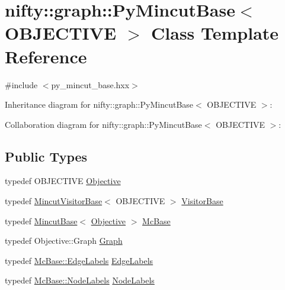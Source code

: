 \hypertarget{classnifty_1_1graph_1_1PyMincutBase}{}\section{nifty\+:\+:graph\+:\+:Py\+Mincut\+Base$<$ O\+B\+J\+E\+C\+T\+I\+V\+E $>$ Class Template Reference}
\label{classnifty_1_1graph_1_1PyMincutBase}


{\ttfamily \#include $<$py\+\_\+mincut\+\_\+base.\+hxx$>$}



Inheritance diagram for nifty\+:\+:graph\+:\+:Py\+Mincut\+Base$<$ O\+B\+J\+E\+C\+T\+I\+V\+E $>$\+:


Collaboration diagram for nifty\+:\+:graph\+:\+:Py\+Mincut\+Base$<$ O\+B\+J\+E\+C\+T\+I\+V\+E $>$\+:
\subsection*{Public Types}
\begin{DoxyCompactItemize}
\item 
typedef O\+B\+J\+E\+C\+T\+I\+V\+E \hyperlink{classnifty_1_1graph_1_1PyMincutBase_a0d42d028691f6bc4cc12dc98d72a551a}{Objective}
\item 
typedef \hyperlink{namespacenifty_1_1graph_abcf758110c216f393d7f20219d3fcf1b}{Mincut\+Visitor\+Base}$<$ O\+B\+J\+E\+C\+T\+I\+V\+E $>$ \hyperlink{classnifty_1_1graph_1_1PyMincutBase_a29aa86dab1d9d51b0c53992df95f94b7}{Visitor\+Base}
\item 
typedef \hyperlink{classnifty_1_1graph_1_1MincutBase}{Mincut\+Base}$<$ \hyperlink{classnifty_1_1graph_1_1MincutBase_afac19d146202da5a1d3a4aa4b89ea1fc}{Objective} $>$ \hyperlink{classnifty_1_1graph_1_1PyMincutBase_a0bf9e1bc1cb78b5950ca9d470eb12428}{Mc\+Base}
\item 
typedef Objective\+::\+Graph \hyperlink{classnifty_1_1graph_1_1PyMincutBase_a2e4ede4ebb88bade74760108d2f79652}{Graph}
\item 
typedef \hyperlink{classnifty_1_1graph_1_1MincutBase_a79320522726432c6f7e2f2b2c632683e}{Mc\+Base\+::\+Edge\+Labels} \hyperlink{classnifty_1_1graph_1_1PyMincutBase_a7c378974e38484a03cebc88abe5ec7a8}{Edge\+Labels}
\item 
typedef \hyperlink{classnifty_1_1graph_1_1MincutBase_a9dc6555e37d38de23f194f87ca1497d5}{Mc\+Base\+::\+Node\+Labels} \hyperlink{classnifty_1_1graph_1_1PyMincutBase_add7d75786f7917e199efa4509c61f9b9}{Node\+Labels}
\end{DoxyCompactItemize}
